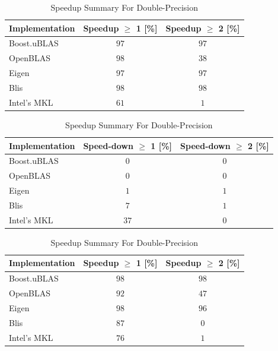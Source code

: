 \begin{table}[ht]
    \centering
    \caption{Speedup Summary For Single-Precision}
    \begin{tabular}{|l|c|c|}
        \hline
        \textbf{Implementation} & \textbf{Speedup $\geq$ 1 [\%]} & \textbf{Speedup $\geq$ 2 [\%]}\\
        \hline
        Boost.uBLAS & $97$ & $97$ \\
        \hline
        OpenBLAS    & $98$ & $38$ \\
        \hline
        Eigen       & $97$ & $97$ \\
        \hline
        Blis        & $98$ & $98$ \\
        \hline
        Intel's MKL & $61$ & $1$ \\
        \hline
    \end{tabular}
    
    \begin{tabular}{|l|c|c|}
        \hline
        \textbf{Implementation} & \textbf{Speed-down $\geq$ 1 [\%]} & \textbf{Speed-down $\geq$ 2 [\%]}\\
        \hline
        Boost.uBLAS & $0$ & $0$ \\
        \hline
        OpenBLAS    & $0$ & $0$ \\
        \hline
        Eigen       & $1$ & $1$ \\
        \hline
        Blis        & $7$ & $1$ \\
        \hline
        Intel's MKL & $37$ & $0$ \\
        \hline
    \end{tabular}
    
    \vspace*{1 cm}

    \centering
    \caption{Speedup Summary For Double-Precision}
    \begin{tabular}{|l|c|c|}
        \hline
        \textbf{Implementation} & \textbf{Speedup $\geq$ 1 [\%]} & \textbf{Speedup $\geq$ 2 [\%]}\\
        \hline
        Boost.uBLAS & $98$ & $98$ \\
        \hline
        OpenBLAS    & $92$ & $47$ \\
        \hline
        Eigen       & $98$ & $96$ \\
        \hline
        Blis        & $87$ & $0$ \\
        \hline
        Intel's MKL & $76$ & $1$ \\
        \hline
    \end{tabular}
    

\end{table}
